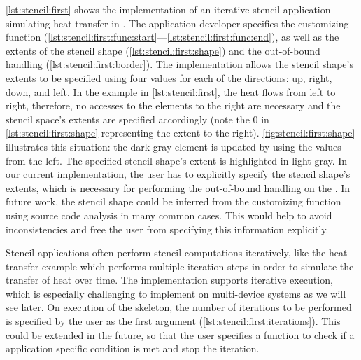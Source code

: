 \autoref{lst:stencil:first} shows the implementation of an iterative stencil application simulating heat transfer in \SkelCL.
The application developer specifies the customizing function (\autoref{lst:stencil:first:func:start}---\autoref{lst:stencil:first:func:end}), as well as the extents of the stencil shape (\autoref{lst:stencil:first:shape}) and the out-of-bound handling (\autoref{lst:stencil:first:border}).
The  implementation allows the stencil shape's extents to be specified using four values for each of the directions:
up, right, down, and left.
In the example in \autoref{lst:stencil:first}, the heat flows from left to right, therefore, no accesses to the elements to the right are necessary and the stencil space's extents are specified accordingly (note the $0$ in \autoref{lst:stencil:first:shape} representing the extent to the right).
\autoref{fig:stencil:first:shape} illustrates this situation: the dark gray element is updated by using the values from the left.
The specified stencil shape's extent is highlighted in light gray.
In our current implementation, the user has to explicitly specify the stencil shape's extents, which is necessary for performing the out-of-bound handling on the \GPU.
In future work, the stencil shape could be inferred from the customizing function using source code analysis in many common cases.
This would help to avoid inconsistencies and free the user from specifying this information explicitly.

Stencil applications often perform stencil computations iteratively, like the heat transfer example which performs multiple iteration steps in order to simulate the transfer of heat over time.
The  implementation supports iterative execution, which is especially challenging to implement on multi-device systems as we will see later.
On execution of the skeleton, the number of iterations to be performed is specified by the user as the first argument (\autoref{lst:stencil:first:iterations}).
This could be extended in the future, so that the user specifies a function to check if a application specific condition is met and stop the iteration.

